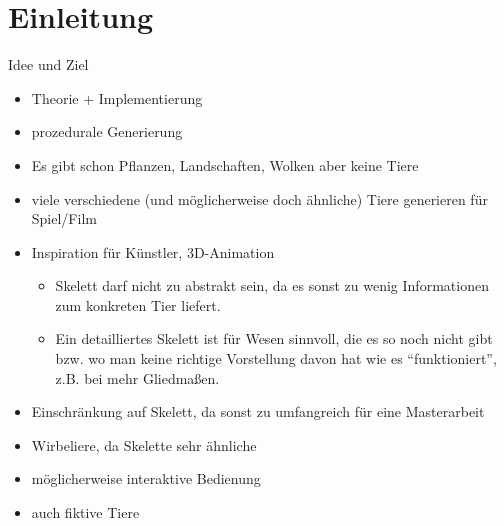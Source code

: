 \chapter{Einleitung}

Idee und Ziel

\begin{itemize}
 \item Theorie + Implementierung
 \item prozedurale Generierung
 \item Es gibt schon Pflanzen, Landschaften, Wolken \etc aber keine Tiere
 \item viele verschiedene (und möglicherweise doch ähnliche) Tiere generieren für Spiel/Film
 \item Inspiration für Künstler, 3D-Animation
    \begin{itemize}
     \item Skelett darf nicht zu abstrakt sein, da es sonst zu wenig Informationen zum konkreten Tier liefert.
     \item Ein detailliertes Skelett ist für Wesen sinnvoll, die es so noch nicht gibt bzw. wo man keine richtige Vorstellung davon hat wie es "`funktioniert"', z.B. bei mehr Gliedmaßen.
    \end{itemize}
 \item Einschränkung auf Skelett, da sonst zu umfangreich für eine Masterarbeit
 \item Wirbeliere, da Skelette sehr ähnliche
 \item möglicherweise interaktive Bedienung
 \item auch fiktive Tiere
\end{itemize}


